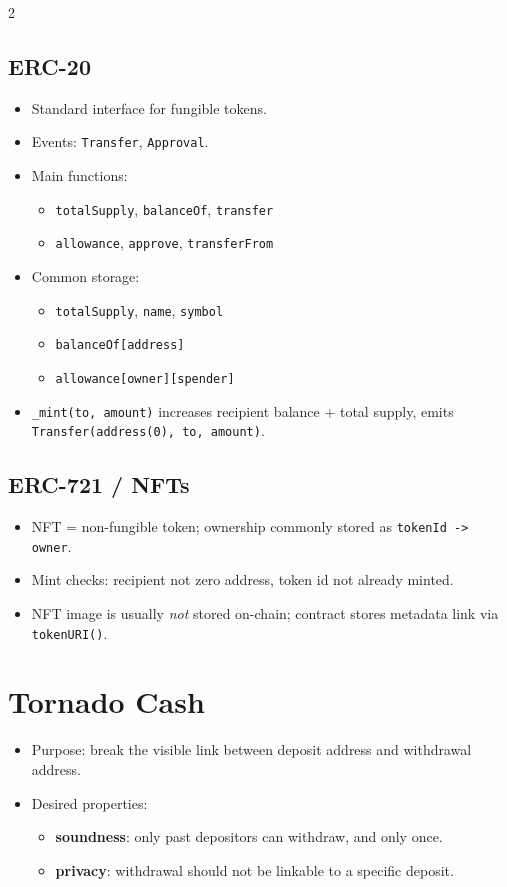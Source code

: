 \documentclass[10pt,a4paper]{article}
\newcommand{\term}[1]{\textbf{#1}}
\newcommand{\code}[1]{\texttt{#1}}
\begin{document}
\begin{multicols*}{2}
\subsection*{ERC-20}
\begin{itemize}
\item Standard interface for fungible tokens.
\item Events: \code{Transfer}, \code{Approval}.
\item Main functions:
\begin{itemize}
\item \code{totalSupply}, \code{balanceOf}, \code{transfer}
\item \code{allowance}, \code{approve}, \code{transferFrom}
\end{itemize}
\item Common storage:
\begin{itemize}
\item \code{totalSupply}, \code{name}, \code{symbol}
\item \code{balanceOf[address]}
\item \code{allowance[owner][spender]}
\end{itemize}
\item \code{\_mint(to, amount)} increases recipient balance + total supply, emits \code{Transfer(address(0), to, amount)}.
\end{itemize}

\subsection*{ERC-721 / NFTs}
\begin{itemize}
\item NFT = non-fungible token; ownership commonly stored as \code{tokenId -> owner}.
\item Mint checks: recipient not zero address, token id not already minted.
\item NFT image is usually \emph{not} stored on-chain; contract stores metadata link via \code{tokenURI()}.
\end{itemize}

\section*{Tornado Cash}
\begin{itemize}
\item Purpose: break the visible link between deposit address and withdrawal address.
\item Desired properties:
\begin{itemize}
\item \term{soundness}: only past depositors can withdraw, and only once.
\item \term{privacy}: withdrawal should not be linkable to a specific deposit.
\end{itemize}
\end{itemize}


\end{multicols*}
\end{document}
